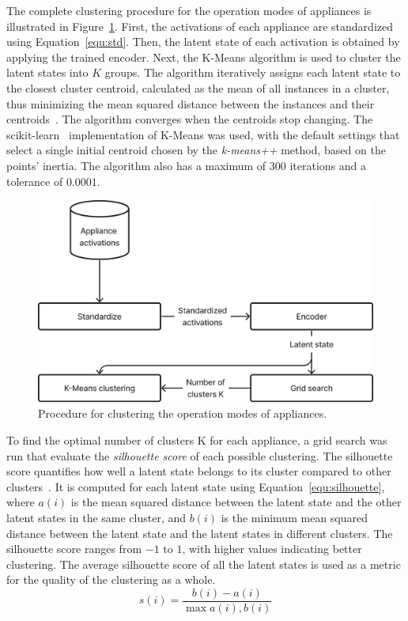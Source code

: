 The complete clustering procedure for the operation modes of appliances is illustrated in Figure~\ref{fig:clustering}. First, the activations of each appliance are standardized using Equation~\eqref{equ:std}. Then, the latent state of each activation is obtained by applying the trained encoder. Next, the K-Means algorithm is used to cluster the latent states into $K$ groups. The algorithm iteratively assigns each latent state to the closest cluster centroid, calculated as the mean of all instances in a cluster, thus minimizing the mean squared distance between the instances and their centroids~\parencite{lloyd_least_1982}. The algorithm converges when the centroids stop changing. The scikit-learn~\parencite*{pedregosa_scikit-learn_2011,buitinck_api_2013} implementation of K-Means was used, with the default settings that select a single initial centroid chosen by the \textit{k-means++} method, based on the points’ inertia. The algorithm also has a maximum of $300$ iterations and a tolerance of $0.0001$.

\begin{figure}
    \centering
    \includegraphics[width=.5\linewidth]{images/clustering.png}
    \caption{Procedure for clustering the operation modes of appliances.}
    \label{fig:clustering}
\end{figure}

To find the optimal number of clusters K for each appliance, a grid search was run that evaluate the \textit{silhouette score} of each possible clustering. The silhouette score quantifies how well a latent state belongs to its cluster compared to other clusters~\parencite{rousseeuw_silhouettes_1987}. It is computed for each latent state using Equation~\eqref{equ:silhouette}, where $a(i)$ is the mean squared distance between the latent state and the other latent states in the same cluster, and $b(i)$ is the minimum mean squared distance between the latent state and the latent states in different clusters. The silhouette score ranges from $-1$ to $1$, with higher values indicating better clustering. The average silhouette score of all the latent states is used as a metric for the quality of the clustering as a whole.
\begin{equation}\label{equ:silhouette}
s(i) = \frac{b(i) - a(i)}{\max{a(i), b(i)}}
\end{equation}

